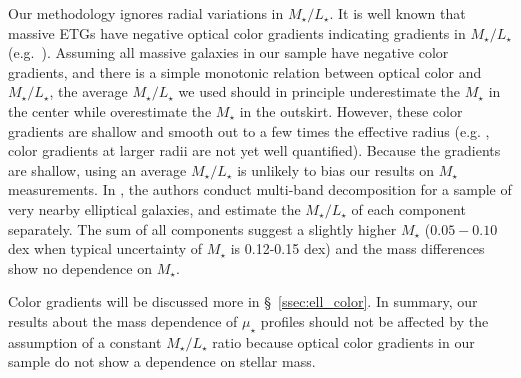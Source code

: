\documentclass[a4paper,fleqn,usenatbib]{mnras}
\def\ser{{S\'{e}rsic\ }}
\def\mstar{{$M_{\star}$}}
\def\m2l{{$M_{\star}/L_{\star}$}}
\def\mden{{$\mu_{\star}$}}
\begin{document}
    Our methodology ignores radial variations in \m2l{}. 
    It is well known that massive ETGs have negative optical color gradients 
    indicating gradients in \m2l{} (e.g.\ \citealt{Carollo1993, Davies1993, 
    LaBarbera2012, DSouza2015}). 
    Assuming all massive galaxies in our sample have negative color gradients, and 
    there is a simple monotonic relation between optical color and \m2l{}, the
    average \m2l{} we used should in principle underestimate the \mstar{} in the 
    center while overestimate the \mstar{} in the outskirt.
    However, these color gradients are shallow and smooth out to a few times the 
    effective radius (e.g. \citealt{LaBarbera2010, Tal2011, DSouza2014}, 
    color gradients at larger radii are not yet well quantified). 
    Because the gradients are shallow, using an average \m2l{} is unlikely to bias 
    our results on \mstar{} measurements.  
    In \citet{Huang2016}, the authors conduct multi-band decomposition for a sample 
    of very nearby elliptical galaxies, and estimate the \m2l{} of each component 
    separately. 
    The sum of all components suggest a slightly higher \mstar{} ($0.05-0.10$ dex 
    when typical uncertainty of \mstar{} is 0.12-0.15 dex) and the mass differences 
    show no dependence on \mstar{}. 
 
    Color gradients will be discussed more in \S~\ref{ssec:ell_color}. 
    In summary, our results about the mass dependence of \mden{} profiles should not 
    be affected by the assumption of a constant \m2l{} ratio because optical color 
    gradients in our sample do not show a dependence on stellar mass.
    
    
    
\end{document}
